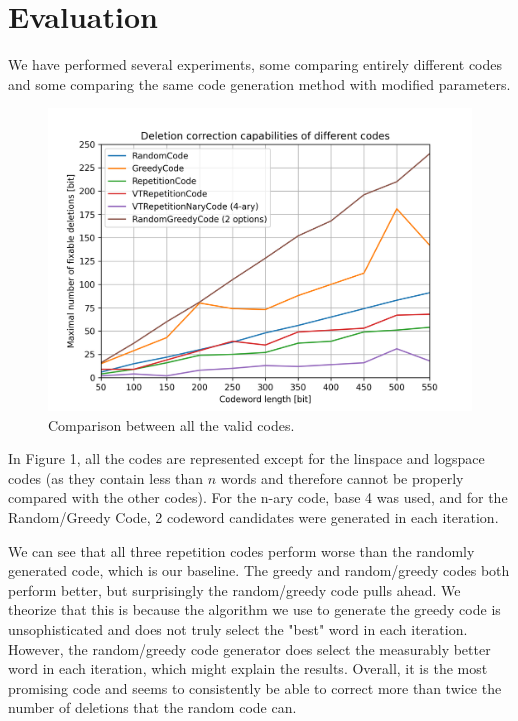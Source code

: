 \documentclass{article}
\begin{document}
\section{Evaluation}
We have performed several experiments, some comparing entirely different codes and some comparing the same code generation method with modified parameters.

\begin{figure}[H]
    \centering
    \includegraphics[width=1\textwidth]{artifacts/figure1.png}
    \caption{Comparison between all the valid codes.}
\end{figure}

\noindent In Figure 1, all the codes are represented except for the linspace and logspace codes (as they contain less than $n$ words and therefore cannot be properly compared with the other codes). For the n-ary code, base 4 was used, and for the Random/Greedy Code, 2 codeword candidates were generated in each iteration.

We can see that all three repetition codes perform worse than the randomly generated code, which is our baseline.
The greedy and random/greedy codes both perform better, but surprisingly the random/greedy code pulls ahead. We theorize that this is because the algorithm we use to generate the greedy code is unsophisticated and does not truly select the "best" word in each iteration. However, the random/greedy code generator does select the measurably better word in each iteration, which might explain the results. Overall, it is the most promising code and seems to consistently be able to correct more than twice the number of deletions that the random code can.
\end{document}
